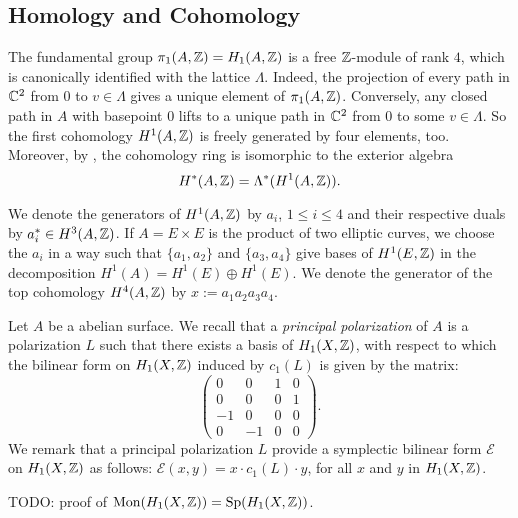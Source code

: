 \subsection{Homology and Cohomology}
The fundamental group $\pi_1(A,\mathbb{Z}) = H_1(A,\mathbb{Z})$ is a free $\mathbb{Z}$-module of rank $4$, which is canonically identified with the lattice $\Lambda$. Indeed, the projection of every path in $\mathbb{C}^2$ from $0$ to $v\in \Lambda$ gives a unique element of $\pi_1(A,\mathbb{Z})$. Conversely, any closed path in $A$ with basepoint $0$ lifts to a unique path in $\mathbb{C}^2$ from $0$ to some $v\in\Lambda$.
So the first cohomology $H^1(A,\mathbb{Z})$ is freely generated by four elements, too. Moreover, by \cite[Sect.~I.1]{Mumford}, the cohomology ring is isomorphic to the exterior algebra
$$
H^*(A,\mathbb{Z}) = \Lambda^*(H^1(A,\mathbb{Z})).
$$
\begin{notation} \label{TorusClasses}
We denote the generators of $H^1(A,\mathbb{Z})$ by $a_i$, $1\leq i\leq 4$ and their respective duals by $a_i^*\in H^3(A,\mathbb{Z})$. 
If $A=E\times E$ is the product of two elliptic curves, we choose the $a_i$ in a way such that $\{a_1,a_2\}$ and $\{a_3,a_4\}$ give bases of $H^1(E,\mathbb{Z})$ in the decomposition $H^1(A) = H^1(E)\oplus H^1(E)$.
We denote the generator of the top cohomology $H^4(A,\mathbb{Z})$ by $x := a_1 a_2 a_3 a_4$.
\end{notation}



Let $A$ be a abelian surface. We recall that a \emph{principal polarization} of $A$ is a polarization $L$ such that there exists a basis of $H_1(X,\mathbb{Z})$, with respect to which the bilinear form on $H_1(X,\mathbb{Z})$ induced by $c_1(L)$ is given by the matrix:
$$\left( {\begin{array}{cccc}
   0 & 0 & 1 & 0 \\    0 &  0 & 0 & 1\\ -1 & 0 & 0 & 0\\ 0 & -1 & 0 & 0     
   \end{array} } \right).$$
We remark that a principal polarization $L$ provide a symplectic bilinear form $\mathcal{E}$ on $H_1(X,\mathbb{Z})$ as follows:
$\mathcal{E}(x,y)=x\cdot c_1(L)\cdot y$, for all $x$ and $y$ in $H_1(X,\mathbb{Z})$.

TODO: proof of $\operatorname{Mon} (H_1(X,\mathbb{Z}))=\operatorname{Sp}(H_1(X,\mathbb{Z}))$.
